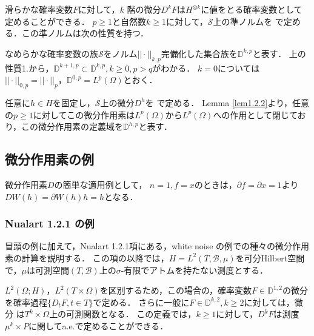 滑らかな確率変数$F$に対して，$k$ 階の微分$D^kF$は$H^{\otimes k}$に値をとる確率変数として定めることができる．
$p\ge1$と自然数$k\ge1$に対して，$\mathcal{S}$上の準ノルムを
で定める．この準ノルムは次の性質を持つ．

なめらかな確率変数の族$\mathcal{S}$をノルム$||\cdot||_{k,p}$完備化した集合族を$\mathbb{D}^{k,p}$と表す．
上の性質1.から，$\mathbb{D}^{k+1,p}\subset\mathbb{D}^{k,p},k\ge0,p>q$がわかる．
$k=0$については$||\cdot||_{0,p}=||\cdot||_p$，$\mathbb{D}^{0,p}=L^p(\Omega)$とおく．

任意に$h\in H$を固定し，$\mathcal{S}$上の微分$D^h$を
で定める．
Lemma \ref{lem1.2.2}より，任意の$p\ge1$に対してこの微分作用素は$L^p(\Omega)$から$L^p(\Omega)$への作用として閉じており，この微分作用素の定義域を$\mathbb{D}^{h,p}$と表す．

\subsection{微分作用素の例}
微分作用素$D$の簡単な適用例として，
$n=1,f=x$のときは，$\partial f=\partial x=1$より$DW(h)=\partial W(h)h=h$となる．

\subsubsection{Nualart \cite{Nualart2006} 1.2.1 の例}
冒頭の例に加えて，Nualart\cite{Nualart2006} 1.2.1項にある，white noise の例での種々の微分作用素の計算を説明する．
この項の以降では，$H=L^2(T,\mathcal{B},\mu)$を可分Hilbert空間で，$\mu$は可測空間$(T,\mathcal{B})$上の$\sigma$-有限でアトムを持たない測度とする．

$L^2(\Omega ;H)$，$L^2(T\times\Omega)$を区別するため，この場合の，確率変数$F\in\mathbb{D}^{1,2}$の微分を確率過程$\{D_tF,t\in T\}$で定める．
さらに一般に$F\in\mathbb{D}^{k,2},k\ge 2$に対しては，微分
は$T^k\times\Omega$上の可測関数となる．
この定義では，$k\ge1$に対して，$D^kF$は測度$\mu^k\times P$に関してa.e.で定めることができる．

